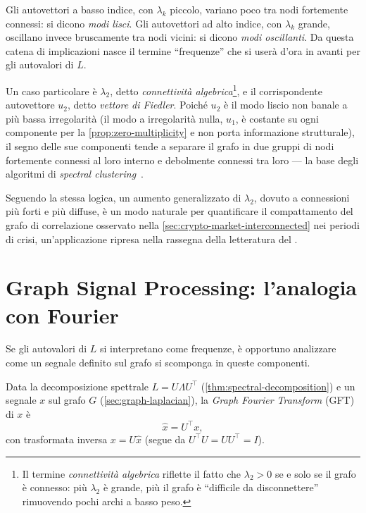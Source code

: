 Gli autovettori a basso indice, con $\lambda_k$ piccolo, variano poco tra nodi fortemente connessi: si dicono \emph{modi lisci}. Gli autovettori ad alto indice, con $\lambda_k$ grande, oscillano invece bruscamente tra nodi vicini: si dicono \emph{modi oscillanti}. Da questa catena di implicazioni nasce il termine \enquote{frequenze} che si userà d'ora in avanti per gli autovalori di $L$.

Un caso particolare è $\lambda_2$, detto \emph{connettività algebrica}\footnote{Il termine \emph{connettività algebrica} riflette il fatto che $\lambda_2>0$ se e solo se il grafo è connesso: più $\lambda_2$ è grande, più il grafo è \enquote{difficile da disconnettere} rimuovendo pochi archi a basso peso.}, e il corrispondente autovettore $u_2$, detto \emph{vettore di Fiedler}. Poiché $u_2$ è il modo liscio non banale a più bassa irregolarità (il modo a irregolarità nulla, $u_1$, è costante su ogni componente per la \cref{prop:zero-multiplicity} e non porta informazione strutturale), il segno delle sue componenti tende a separare il grafo in due gruppi di nodi fortemente connessi al loro interno e debolmente connessi tra loro — la base degli algoritmi di \emph{spectral clustering}~\cite{vonluxburg2007tutorial}.

Seguendo la stessa logica, un aumento generalizzato di $\lambda_2$, dovuto a connessioni più forti e più diffuse, è un modo naturale per quantificare il compattamento del grafo di correlazione osservato nella \cref{sec:crypto-market-interconnected} nei periodi di crisi, un'applicazione ripresa nella rassegna della letteratura del .

\section{Graph Signal Processing: l'analogia con Fourier}
\label{sec:graph-signal-processing-fourier}

Se gli autovalori di $L$ si interpretano come frequenze, è opportuno analizzare come un segnale definito sul grafo si scomponga in queste componenti.

\begin{definition}
\label{def:gft}
Data la decomposizione spettrale $L=U\Lambda U^\top$ (\cref{thm:spectral-decomposition}) e un segnale $x$ sul grafo $G$ (\cref{sec:graph-laplacian}), la \emph{Graph Fourier Transform} (GFT) di $x$ è
$$\hat x = U^\top x,$$
con trasformata inversa $x = U\hat x$ (segue da $U^\top U = UU^\top = I$).
\end{definition}


